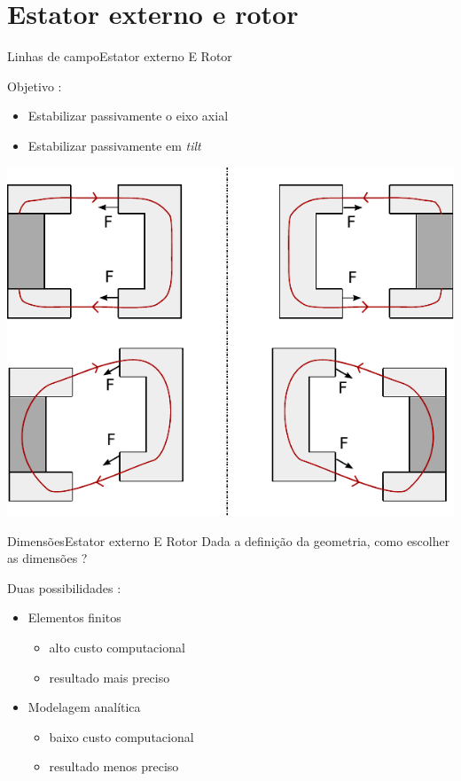 \documentclass{beamer}
\begin{document}
\section{Estator externo e rotor}

\begin{frame}{Linhas de campo}{Estator externo E Rotor}

Objetivo :
\begin{itemize}
	\item Estabilizar passivamente o eixo axial
	\item Estabilizar passivamente em \textit{tilt}
\end{itemize}
\pause
	\begin{center}
		\includegraphics[width=0.7\linewidth]{../../Dissertacao/Figs/modelo_circuito_passivo_forcas_c}
	\end{center}
\end{frame}	


\begin{frame}{Dimensões}{Estator externo E Rotor}
	Dada	 a definição da geometria, como escolher as dimensões ?

	\pause
	\vspace{10px}

	Duas possibilidades :
	\begin{itemize}
		\item Elementos finitos
		\begin{itemize}
			\item alto custo computacional 
			\item resultado mais preciso
		\end{itemize}
		\item Modelagem analítica
		\begin{itemize}
			\item baixo custo computacional
			\item resultado menos preciso
		\end{itemize}
	\end{itemize}
	
\end{frame}
\end{document}

